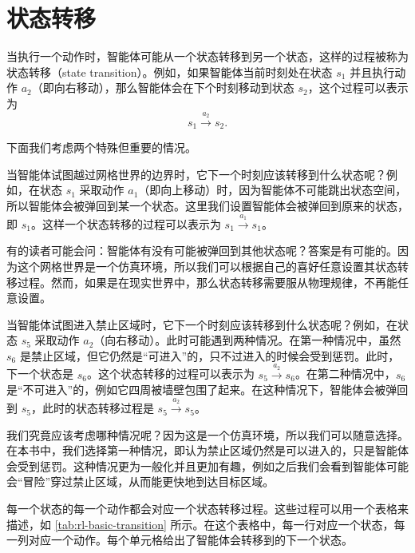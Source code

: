 \section{状态转移}
\label{sec:rl-basic-state-transition}

当执行一个动作时，智能体可能从一个状态转移到另一个状态，这样的过程被称为状态转移（state transition）。例如，如果智能体当前时刻处在状态 $s_1$ 并且执行动作 $a_2$（即向右移动），那么智能体会在下个时刻移动到状态 $s_2$，这个过程可以表示为
\begin{equation}
  s_1 \xrightarrow{a_2} s_2.
\end{equation}

下面我们考虑两个特殊但重要的情况。

当智能体试图越过网格世界的边界时，它下一个时刻应该转移到什么状态呢？例如，在状态 $s_1$ 采取动作 $a_1$（即向上移动）时，因为智能体不可能跳出状态空间，所以智能体会被弹回到某一个状态。这里我们设置智能体会被弹回到原来的状态，即 $s_1$。这样一个状态转移的过程可以表示为 $s_1 \xrightarrow{a_1} s_1$。

有的读者可能会问：智能体有没有可能被弹回到其他状态呢？答案是有可能的。因为这个网格世界是一个仿真环境，所以我们可以根据自己的喜好任意设置其状态转移过程。然而，如果是在现实世界中，那么状态转移需要服从物理规律，不再能任意设置。

当智能体试图进入禁止区域时，它下一个时刻应该转移到什么状态呢？例如，在状态 $s_5$ 采取动作 $a_2$（向右移动）。此时可能遇到两种情况。在第一种情况中，虽然 $s_6$ 是禁止区域，但它仍然是“可进入”的，只不过进入的时候会受到惩罚。此时，下一个状态是 $s_6$。这个状态转移的过程可以表示为 $s_5 \xrightarrow{a_2} s_6$。在第二种情况中，$s_6$ 是“不可进入”的，例如它四周被墙壁包围了起来。在这种情况下，智能体会被弹回到 $s_5$，此时的状态转移过程是 $s_5 \xrightarrow{a_2} s_5$。

我们究竟应该考虑哪种情况呢？因为这是一个仿真环境，所以我们可以随意选择。在本书中，我们选择第一种情况，即认为禁止区域仍然是可以进入的，只是智能体会受到惩罚。这种情况更为一般化并且更加有趣，例如之后我们会看到智能体可能会“冒险”穿过禁止区域，从而能更快地到达目标区域。

每一个状态的每一个动作都会对应一个状态转移过程。这些过程可以用一个表格来描述，如 \cref{tab:rl-basic-transition} 所示。在这个表格中，每一行对应一个状态，每一列对应一个动作。每个单元格给出了智能体会转移到的下一个状态。

